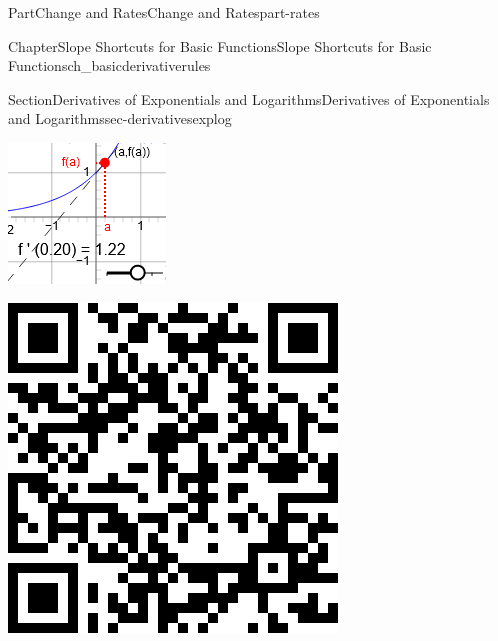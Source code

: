 \documentclass{tufte-book}
\numberwithin{equation}{chapter}
\begin{document}
\begin{partptx}{Part}{Change and Rates}{}{Change and Rates}{}{}{part-rates}
\begin{chapterptx}{Chapter}{Slope Shortcuts for Basic Functions}{}{Slope Shortcuts for Basic Functions}{}{}{ch_basicderivativerules}
\begin{sectionptx}{Section}{Derivatives of Exponentials and Logarithms}{}{Derivatives of Exponentials and Logarithms}{}{}{sec-derivativesexplog}
\begin{sidebyside}{2}{0.075}{0.075}{0.17}
\begin{sbspanel}{0.47}
\includegraphics[width=\linewidth]{external/jsxgraph-findingslopefromtangent-exercise2c.png}
\end{sbspanel}%
\begin{sbspanel}{0.21}%
\includegraphics[width=\linewidth]{generated/qrcode/sec-derivativesexplog-4-3.png}

\end{sbspanel}
\end{sidebyside}
\end{sectionptx}
\end{chapterptx}
\end{partptx}
\end{document}

